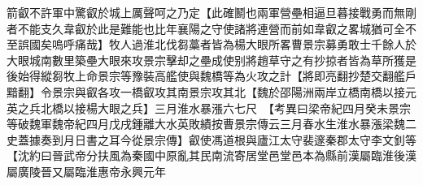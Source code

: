 箭叡不許軍中驚叡於城上厲聲呵之乃定【此確鬭也兩軍營壘相逼旦暮接戰勇而無剛者不能支久韋叡於此是難能也比年襄陽之守使諸將連營而前如韋叡之畧城猶可全不至誤國矣嗚呼痛哉】牧人過淮北伐芻藁者皆為楊大眼所畧曹景宗募勇敢士千餘人於大眼城南數里築壘大眼來攻景宗擊却之壘成使别將趙草守之有抄掠者皆為草所獲是後始得縱芻牧上命景宗等豫裝高艦使與魏橋等為火攻之計【將即亮翻抄楚交翻艦戶黯翻】令景宗與叡各攻一橋叡攻其南景宗攻其北【魏於邵陽洲兩岸立橋南橋以接元英之兵北橋以接楊大眼之兵】三月淮水暴漲六七尺　【考異曰梁帝紀四月癸未景宗等破魏軍魏帝紀四月戊戌鍾離大水英敗績按曹景宗傳云三月春水生淮水暴漲梁魏二史蓋據奏到月日書之耳今從景宗傳】叡使馮道根與廬江太守裴邃秦郡太守李文釗等【沈約曰晉武帝分扶風為秦國中原亂其民南流寄居堂邑堂邑本為縣前漢屬臨淮後漢屬廣陵晉又屬臨淮惠帝永興元年